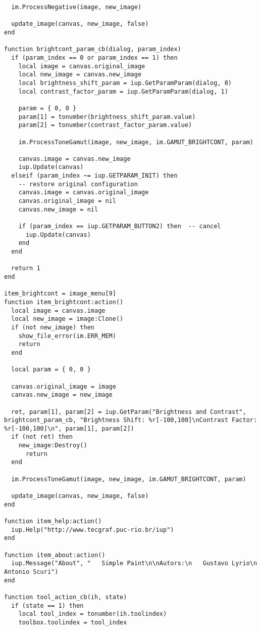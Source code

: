 \documentclass{ctexart}
\begin{document}
\begin{lstlisting}
  im.ProcessNegative(image, new_image)

  update_image(canvas, new_image, false)
end

function brightcont_param_cb(dialog, param_index)
  if (param_index == 0 or param_index == 1) then
    local image = canvas.original_image
    local new_image = canvas.new_image
    local brightness_shift_param = iup.GetParamParam(dialog, 0)
    local contrast_factor_param = iup.GetParamParam(dialog, 1)

    param = { 0, 0 }
    param[1] = tonumber(brightness_shift_param.value)
    param[2] = tonumber(contrast_factor_param.value)

    im.ProcessToneGamut(image, new_image, im.GAMUT_BRIGHTCONT, param)

    canvas.image = canvas.new_image
    iup.Update(canvas)
  elseif (param_index ~= iup.GETPARAM_INIT) then
    -- restore original configuration
    canvas.image = canvas.original_image
    canvas.original_image = nil
    canvas.new_image = nil

    if (param_index == iup.GETPARAM_BUTTON2) then  -- cancel
      iup.Update(canvas)
    end
  end

  return 1
end

item_brightcont = image_menu[9]
function item_brightcont:action()
  local image = canvas.image
  local new_image = image:Clone()
  if (not new_image) then
    show_file_error(im.ERR_MEM)
    return 
  end

  local param = { 0, 0 }

  canvas.original_image = image
  canvas.new_image = new_image

  ret, param[1], param[2] = iup.GetParam("Brightness and Contrast", brightcont_param_cb, "Brightness Shift: %r[-100,100]\nContrast Factor: %r[-100,100]\n", param[1], param[2])
  if (not ret) then
    new_image:Destroy()
	  return
  end

  im.ProcessToneGamut(image, new_image, im.GAMUT_BRIGHTCONT, param)

  update_image(canvas, new_image, false)
end

function item_help:action()
  iup.Help("http://www.tecgraf.puc-rio.br/iup")
end

function item_about:action()
  iup.Message("About", "   Simple Paint\n\nAutors:\n   Gustavo Lyrio\n   Antonio Scuri")
end

function tool_action_cb(ih, state)
  if (state == 1) then
    local tool_index = tonumber(ih.toolindex)
    toolbox.toolindex = tool_index


\end{lstlisting}
\end{document}
